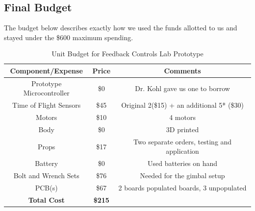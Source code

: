 \documentclass[12pt, titlepage]{article}
\begin{document}
\subsection{Final Budget}
The budget below describes exactly how we used the funds allotted to us and stayed under the \$600 maximum spending. 

\begin{table}[H]
\centering
\caption{Unit Budget for Feedback Controls Lab Prototype}
\label{tab:budget}
\begin{tabular}{||c|c|c||}
\hline 
\hline
\textbf{Component/Expense} & \textbf{Price} & \textbf{Comments} \\ 
\hline 
Prototype Microcontroller & \$0 & Dr. Kohl gave us one to borrow \\
\hline 
Time of Flight Sensors & \$45 & Original 2(\$15) + an additional 5* (\$30) \\
\hline 
Motors & \$10 & 4 motors \\ 
\hline 
Body & \$0 & 3D printed \\ 
\hline 
Props & \$17 & Two separate orders, testing and application \\ 
\hline 
Battery & \$0 & Used batteries on hand \\ 
\hline 
Bolt and Wrench Sets & \$76 & Needed for the gimbal setup \\ 
\hline 
PCB(s) & \$67 & 2 boards populated boards, 3 unpopulated \\ 
\hline 
\textbf{Total Cost} & \textbf{\$215} &   \\ 
\hline 
\hline
\end{tabular} 
\end{table}
\end{document}
